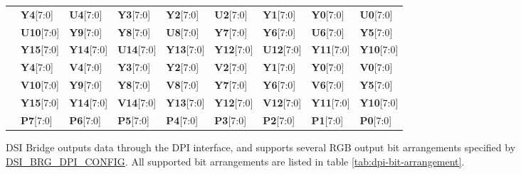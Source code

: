 \documentclass[main\_\_EN.tex]{subfiles}
\begin{document}
\begin{longtable}[c]{ |p{2cm}|p{1.5cm}|p{1.5cm}|p{1.5cm}|p{1.5cm}|p{1.5cm}|p{1.5cm}|p{1.5cm}|p{1.5cm}| }
         & \textbf{Y4}[7:0] & \textbf{U4}[7:0] & \textbf{Y3}[7:0] & \textbf{Y2}[7:0] & \textbf{U2}[7:0] & \textbf{Y1}[7:0] & \textbf{Y0}[7:0] & \textbf{U0}[7:0] \\
        & \textbf{U10}[7:0] & \textbf{Y9}[7:0] & \textbf{Y8}[7:0] & \textbf{U8}[7:0] & \textbf{Y7}[7:0] & \textbf{Y6}[7:0] & \textbf{U6}[7:0] & \textbf{Y5}[7:0] \\
        & \textbf{Y15}[7:0] & \textbf{Y14}[7:0] & \textbf{U14}[7:0] & \textbf{Y13}[7:0] & \textbf{Y12}[7:0] & \textbf{U12}[7:0] & \textbf{Y11}[7:0] & \textbf{Y10}[7:0] \\\hline

         & \textbf{Y4}[7:0] & \textbf{V4}[7:0] & \textbf{Y3}[7:0] & \textbf{Y2}[7:0] & \textbf{V2}[7:0] & \textbf{Y1}[7:0] & \textbf{Y0}[7:0] & \textbf{V0}[7:0] \\
        & \textbf{V10}[7:0] & \textbf{Y9}[7:0] & \textbf{Y8}[7:0] & \textbf{V8}[7:0] & \textbf{Y7}[7:0] & \textbf{Y6}[7:0] & \textbf{V6}[7:0] & \textbf{Y5}[7:0] \\
        & \textbf{Y15}[7:0] & \textbf{Y14}[7:0] & \textbf{V14}[7:0] & \textbf{Y13}[7:0] & \textbf{Y12}[7:0] & \textbf{V12}[7:0] & \textbf{Y11}[7:0] & \textbf{Y10}[7:0] \\\hline

         & \textbf{P7}[7:0] & \textbf{P6}[7:0] & \textbf{P5}[7:0] & \textbf{P4}[7:0] & \textbf{P3}[7:0] & \textbf{P2}[7:0] & \textbf{P1}[7:0] & \textbf{P0}[7:0] \\\hline
        

\end{longtable}
\normalsize

DSI Bridge outputs data through the DPI interface, and supports several RGB output bit arrangements specified by \hyperref[fielddesc:DSIBRGDPICONFIG]{DSI\_BRG\_DPI\_CONFIG}. All supported bit arrangements are listed in table \ref{tab:dpi-bit-arrangement}.
\end{document}
